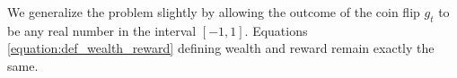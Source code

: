 We generalize the problem slightly by allowing the outcome of the coin flip
$g_t$ to be any real number in the interval $[-1,1]$.  Equations
\eqref{equation:def_wealth_reward} defining
wealth and reward remain exactly the same.

